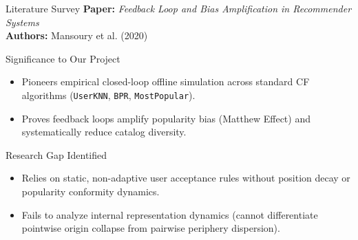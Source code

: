 \documentclass[11pt,aspectratio=43,xcolor=table]{beamer}
\begin{document}
\begin{frame}{Literature Survey}
\small
\textbf{Paper:} \emph{Feedback Loop and Bias Amplification in Recommender Systems} \\
\textbf{Authors:} Mansoury et al. (2020)

\vspace{0.15cm}
\begin{block}{Significance to Our Project}
\begin{itemize}
  \item Pioneers empirical closed-loop offline simulation across standard CF algorithms (\texttt{UserKNN}, \texttt{BPR}, \texttt{MostPopular}).
  \item Proves feedback loops amplify popularity bias (Matthew Effect) and systematically reduce catalog diversity.
\end{itemize}
\end{block}

\vspace{0.05cm}
\begin{block}{Research Gap Identified}
\begin{itemize}
  \item Relies on static, non-adaptive user acceptance rules without position decay or popularity conformity dynamics.
  \item Fails to analyze internal representation dynamics (cannot differentiate pointwise origin collapse from pairwise periphery dispersion).
\end{itemize}
\end{block}
\end{frame}
\end{document}
